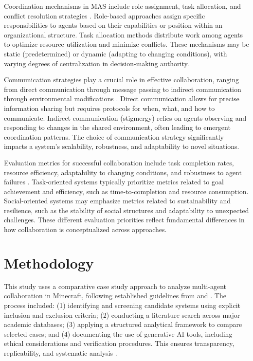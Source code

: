 \documentclass[a4paper, 12pt]{article}
\begin{document}
Coordination mechanisms in MAS include role assignment, task allocation, and conflict resolution strategies \autocite{Dong2024, Shu2024}. Role-based approaches assign specific responsibilities to agents based on their capabilities or position within an organizational structure. Task allocation methods distribute work among agents to optimize resource utilization and minimize conflicts. These mechanisms may be static (predetermined) or dynamic (adapting to changing conditions), with varying degrees of centralization in decision-making authority.

Communication strategies play a crucial role in effective collaboration, ranging from direct communication through message passing to indirect communication through environmental modifications \autocite{Shu2024, Qiu2024}. Direct communication allows for precise information sharing but requires protocols for when, what, and how to communicate. Indirect communication (stigmergy) relies on agents observing and responding to changes in the shared environment, often leading to emergent coordination patterns. The choice of communication strategy significantly impacts a system's scalability, robustness, and adaptability to novel situations.

Evaluation metrics for successful collaboration include task completion rates, resource efficiency, adaptability to changing conditions, and robustness to agent failures \autocite{Shu2024, Qiu2024, Chen2024}. Task-oriented systems typically prioritize metrics related to goal achievement and efficiency, such as time-to-completion and resource consumption. Social-oriented systems may emphasize metrics related to sustainability and resilience, such as the stability of social structures and adaptability to unexpected challenges. These different evaluation priorities reflect fundamental differences in how collaboration is conceptualized across approaches.

\section{Methodology}

This study uses a comparative case study approach to analyze multi-agent collaboration in Minecraft, following established guidelines from \textcite{Yin2018} and \textcite{Eisenhardt1989}. The process included: (1) identifying and screening candidate systems using explicit inclusion and exclusion criteria; (2) conducting a literature search across major academic databases; (3) applying a structured analytical framework to compare selected cases; and (4) documenting the use of generative AI tools, including ethical considerations and verification procedures. This ensures transparency, replicability, and systematic analysis \autocite{Yin2018, Eisenhardt1989}.
\end{document}

